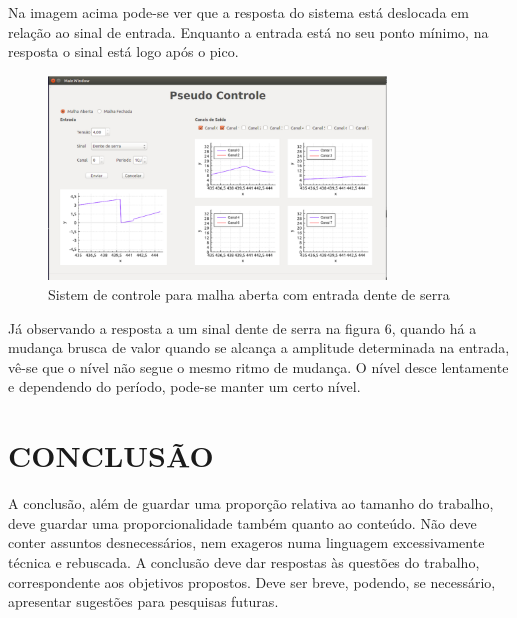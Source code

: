 \documentclass[a4paper,12pt]{article}
\begin{document}
Na imagem acima pode-se ver que a resposta do sistema está deslocada em relação ao sinal de entrada. Enquanto a entrada está no seu ponto mínimo, na resposta o sinal está logo após o pico. 

\begin{figure}[!h]
\centering
\includegraphics[width=0.8\textwidth]{maberta-serra-4.eps}
\caption{Sistem de controle para malha aberta com entrada dente de serra}
\label{Entrada Dente de Serra - aberta}
\end{figure}

\newpage
Já observando a resposta a um sinal dente de serra na figura 6, quando há a mudança brusca de valor quando se alcança a amplitude determinada na entrada, vê-se que o nível não segue o mesmo ritmo de mudança. O nível desce lentamente e dependendo do período, pode-se manter um certo nível.
\newpage


\thispagestyle{main}

\section{CONCLUSÃO}


\hspace{4ex}A conclusão, além de guardar uma proporção relativa ao tamanho do trabalho,
deve guardar uma proporcionalidade também quanto ao conteúdo. Não deve conter
assuntos desnecessários, nem exageros numa linguagem excessivamente técnica e
rebuscada. A conclusão deve dar respostas às questões do trabalho, correspondente aos
objetivos propostos. Deve ser breve, podendo, se necessário, apresentar sugestões para
pesquisas futuras.

\newpage




\appendix


\end{document}
